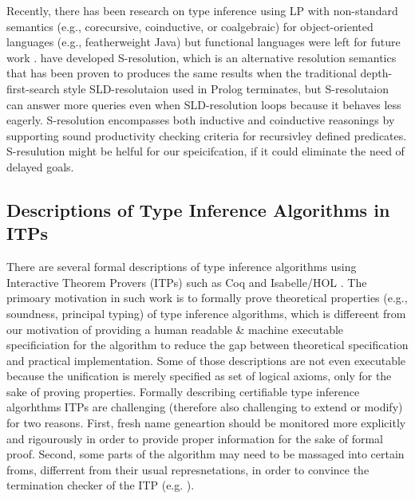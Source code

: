 Recently, there has been research on type inference using LP with non-standard
semantics (e.g., corecursive, coinductive, or coalgebraic) for object-oriented
languages (e.g., featherweight Java) but functional languages were left for
future work \cite{AL-ECOOP09}.
\citet{SRLP15} have developed S-resolution, which is an alternative resolution
semantics that has been proven \cite{PCR15} to produces the same results when
the traditional depth-first-search style SLD-resolutaion used in Prolog
terminates, but S-resolutaion can answer more queries even when SLD-resolution
loops because it behaves less eagerly. S-resolution encompasses both inductive
and coinductive reasonings by supporting sound productivity checking criteria
for recursivley defined predicates. S-resulution might be helful for
our speicifcation, if it could eliminate the need of delayed goals.

\subsection{Descriptions of Type Inference Algorithms in ITPs}
There are several formal descriptions of type inference algorithms using
Interactive Theorem Provers (ITPs) such as Coq \cite{Dubois00} and
Isabelle/HOL \cite{NaraschewskiN-JAR,UrbanN2009}. The primoary motivation
in such work is to formally prove theoretical properties (e.g., soundness,
principal typing) of type inference algorithms, which is differeent from
our motivation of providing a human readable \& machine executable
specificiation for the algorithm to reduce the gap between
theoretical specification and practical implementation. Some of those
descriptions  are not even executable because the unification is merely
specified as set of logical axioms, only for the sake of proving properties.
Formally describing certifiable type inference algorhthms ITPs are challenging
(therefore also challenging to extend or modify) for two reasons. First, fresh
name geneartion should be monitored more explicitly and rigourously in order to
provide proper information for the sake of formal proof. Second, some parts of
the algorithm may need to be massaged into certain froms, differrent from their
usual represnetations, in order to convince the termination checker of the ITP
(e.g. \cite{JFP:185139}).

